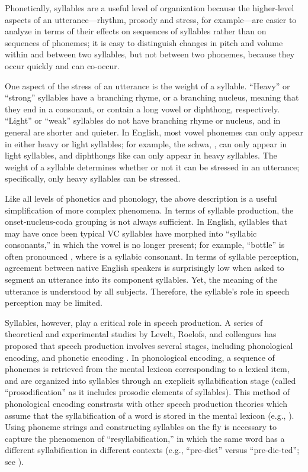 Phonetically, syllables are a useful
level of organization because
the higher-level aspects
of an utterance---rhythm, prosody and stress,
for example---are easier to analyze
in terms of their effects on
sequences of syllables rather than
on sequences of phonemes;
it is easy to distinguish
changes in pitch and volume
within and between two syllables,
but not between two phonemes,
because they occur quickly
and can co-occur.

One aspect of the stress of an utterance
is the weight of a syllable.
``Heavy'' or ``strong'' syllables
have a branching rhyme,
or a branching nucleus,
meaning that they
end in a consonant,
or contain a long vowel or diphthong,
respectively.
``Light'' or ``weak'' syllables
do not have branching rhyme or nucleus,
and in general are shorter
and quieter.
In English, most vowel phonemes
can only appear in either
heavy or light syllables;
for example, the schwa, \ipa{[@]},
can only appear in light syllables,
and diphthongs like \ipa{[aU]}
can only appear in heavy syllables.
The weight of a syllable determines
whether or not it can be stressed
in an utterance;
specifically, only heavy syllables
can be stressed.

Like all levels of phonetics and phonology,
the above description is a useful simplification
of more complex phenomena.
In terms of syllable production,
the onset-nucleus-coda grouping
is not always sufficient.
In English, syllables that may have once
been typical VC syllables have morphed
into ``syllabic consonants,'' in which
the vowel is no longer present;
for example, ``bottle'' is often
pronounced \ipa{[b6tl]},
where \ipa{[l]} is a syllabic consonant.
In terms of syllable perception,
agreement between native English speakers
is surprisingly low when
asked to segment an utterance
into its component syllables.
Yet, the meaning of the utterance
is understood by all subjects.
Therefore, the syllable's
role in speech perception may be limited.

Syllables, however, play a critical role
in speech production.
A series of theoretical and experimental studies
by Levelt, Roelofs, and colleagues
has proposed that speech production
involves several stages,
including phonological encoding,
and phonetic encoding
\citep{levelt1999,roelofs2000,cholin2004}.
In phonological encoding,
a sequence of phonemes is retrieved
from the mental lexicon corresponding
to a lexical item,
and are organized into syllables
through an excplicit syllabification stage
(called ``prosodification'' as it
includes prosodic elements of syllables).
This method of phonological encoding
constrasts with other speech production theories
which assume that the syllabification
of a word is stored in the mental lexicon
(e.g., \citealt{dell1988}).
Using phoneme strings and constructing
syllables on the fly
is necessary to capture
the phenomenon of ``resyllabification,''
in which the same word
has a different syllabification
in different contexts
(e.g., ``pre-dict'' versus
``pre-dic-ted'';
see \citealt{cholin2004}).

